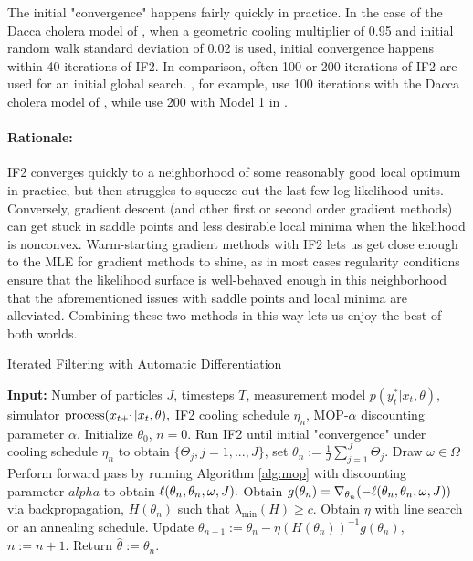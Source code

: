 \documentclass{article}
\begin{document}
The initial "convergence" happens fairly quickly in practice. In the case of the Dacca cholera model of \cite{king08}, when a geometric cooling multiplier of 0.95 and initial random walk standard deviation of 0.02 is used, initial convergence happens within 40 iterations of IF2. In comparison, often 100 or 200 iterations of IF2 are used for an initial global search. \cite{ionides15}, for example, use 100 iterations with the Dacca cholera model of \cite{king08}, while \cite{wheeler23} use 200 with Model 1 in \cite{Lee_haiticholera}. 

\paragraph{Rationale:}

IF2 converges quickly to a neighborhood of some reasonably good local optimum in practice, but then struggles to squeeze out the last few log-likelihood units. Conversely, gradient descent (and other first or second order gradient methods) can get stuck in saddle points and less desirable local minima when the likelihood is nonconvex. Warm-starting gradient methods with IF2 lets us get close enough to the MLE for gradient methods to shine, as in most cases regularity conditions ensure that the likelihood surface is well-behaved enough in this neighborhood that the aforementioned issues with saddle points and local minima are alleviated. Combining these two methods in this way lets us enjoy the best of both worlds.

\begin{algorithm}[H]
\centering
	\caption{Iterated Filtering with Automatic Differentiation}
    \label{alg:ifad}
	\begin{algorithmic}[1]
	     \STATE \textbf{Input:} Number of particles $J$, timesteps $T$, measurement model $p(y_t^*|x_t, \theta)$, simulator $\text{process}(x_{t+1}|x_t, \theta),$ IF2 cooling schedule $\eta_n$, MOP-$\alpha$ discounting parameter $\alpha$.
		\STATE Initialize $\theta_0$, $n=0.$
        \STATE Run IF2 until initial "convergence" under cooling schedule $\eta_n$ to obtain $\{\Theta_j, j=1,...,J\}$, set $\theta_n := \frac{1}{J}\sum_{j=1}^J \Theta_j.$
		\STATE Draw $\omega \in \Omega$
		\STATE Perform forward pass by running Algorithm \ref{alg:mop} with discounting parameter $alpha$ to obtain $\ell(\theta_n, \theta_n, \omega, J).$
		\STATE Obtain $g(\theta_n) = \nabla_{\theta_n} (-\ell(\theta_n, \theta_n, \omega, J))$ via backpropagation, $H(\theta_n)$ such that $\lambda_{\min}(H) \geq c$.
		\STATE Obtain $\eta$ with line search or an annealing schedule.
		\STATE Update $\theta_{n+1} := \theta_n - \eta (H(\theta_n))^{-1} g(\theta_n)$, $n:=n+1.$
		\ENDWHILE
		\STATE Return $\hat{\theta} := \theta_n.$
	\end{algorithmic}
\end{algorithm}
\end{document}
